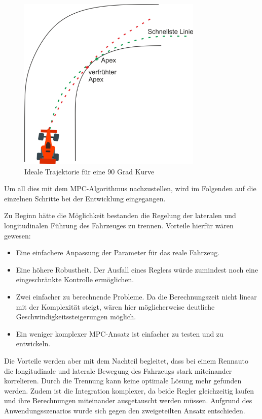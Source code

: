 \documentclass{like}
\begin{document}
\begin{figure}[ht!]
	\centering
	\includegraphics[width=250pt]{Abbildungen/apexTrajektory.png}
	\caption{Ideale Trajektorie für eine 90 Grad Kurve}
	\label{fig:idealTrajektorie}
\end{figure}


Um all dies mit dem \ac{MPC}-Algorithmus nachzustellen, wird im Folgenden auf die einzelnen Schritte bei der Entwicklung eingegangen.

Zu Beginn hätte die Möglichkeit bestanden die Regelung der lateralen und longitudinalen Führung des Fahrzeuges zu trennen. 
Vorteile hierfür wären gewesen:
\begin{itemize}
	\item Eine einfachere Anpassung der Parameter für das reale Fahrzeug.
	\item Eine höhere Robustheit. Der Ausfall eines Reglers würde zumindest noch eine eingeschränkte Kontrolle ermöglichen.
	\item Zwei einfacher zu berechnende Probleme. Da die Berechnungszeit nicht linear mit der Komplexität steigt, wären hier möglicherweise deutliche Geschwindig\-keits\-stei\-ger\-ung\-en möglich.
	\item Ein weniger komplexer \ac{MPC}-Ansatz ist einfacher zu testen und zu entwickeln.
\end{itemize}

Die Vorteile werden aber mit dem Nachteil begleitet, dass bei einem Rennauto die longitudinale und laterale Bewegung des Fahrzeugs stark miteinander korrelieren. Durch die Trennung kann keine optimale Lösung mehr gefunden werden. 
Zudem ist die Integration komplexer, da beide Regler gleichzeitig laufen und ihre Berechnungen miteinander aus\-ge\-tau\-scht werden müssen.
Aufgrund des Anwendungsszenarios wurde sich gegen den zweigeteilten Ansatz entschieden.
\end{document}
